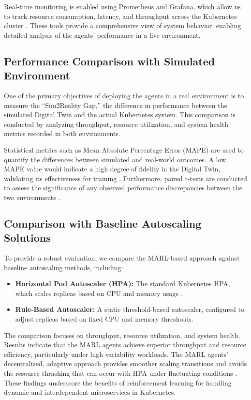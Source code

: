 \documentclass[conference]{IEEEtran}
\begin{document}
Real-time monitoring is enabled using Prometheus and Grafana, which allow us to track resource consumption, latency, and throughput across the Kubernetes cluster \cite{prometheus_grafana}. These tools provide a comprehensive view of system behavior, enabling detailed analysis of the agents’ performance in a live environment.

\subsection{Performance Comparison with Simulated Environment}

One of the primary objectives of deploying the agents in a real environment is to measure the ``Sim2Reality Gap,'' the difference in performance between the simulated Digital Twin and the actual Kubernetes system. This comparison is conducted by analyzing throughput, resource utilization, and system health metrics recorded in both environments. 

Statistical metrics such as Mean Absolute Percentage Error (MAPE) are used to quantify the differences between simulated and real-world outcomes. A low MAPE value would indicate a high degree of fidelity in the Digital Twin, validating its effectiveness for training \cite{tan_nn_resource_approx}. Furthermore, paired t-tests are conducted to assess the significance of any observed performance discrepancies between the two environments \cite{wu_multi_objective_rl}.

\subsection{Comparison with Baseline Autoscaling Solutions}

To provide a robust evaluation, we compare the MARL-based approach against baseline autoscaling methods, including:
\begin{itemize}
    \item \textbf{Horizontal Pod Autoscaler (HPA):} The standard Kubernetes HPA, which scales replicas based on CPU and memory usage \cite{hpa_design}.
    \item \textbf{Rule-Based Autoscaler:} A static threshold-based autoscaler, configured to adjust replicas based on fixed CPU and memory thresholds.
\end{itemize}

The comparison focuses on throughput, resource utilization, and system health. Results indicate that the MARL agents achieve superior throughput and resource efficiency, particularly under high variability workloads. The MARL agents' decentralized, adaptive approach provides smoother scaling transitions and avoids the resource thrashing that can occur with HPA under fluctuating conditions \cite{zhang_marl_k8s}. These findings underscore the benefits of reinforcement learning for handling dynamic and interdependent microservices in Kubernetes.
\end{document}
